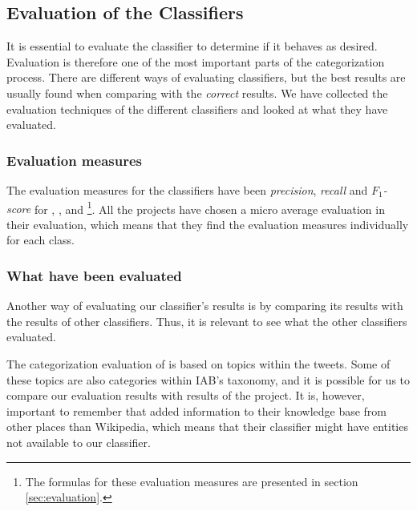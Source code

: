 \subsection{Evaluation of the Classifiers}
It is essential to evaluate the classifier to determine if it behaves as desired. Evaluation is therefore one of the most important parts of the categorization process. There are different ways of evaluating classifiers, but the best results are usually found when comparing with the \emph{correct} results. %
We have collected the evaluation techniques of the different classifiers and looked at what they have evaluated.%

\subsubsection{Evaluation measures}
The evaluation measures for the classifiers have been \emph{precision}, \emph{recall} and \emph{$F_{1}$-score} for \cite{schonhofen2009identifying}, \cite{entityextraction}, \cite{brittleness} and \cite{kozlova2005automatic}\footnote{The formulas for these evaluation measures are presented in section \ref{sec:evaluation}.}. All the projects have chosen a micro average evaluation in their evaluation, which means that they find the evaluation measures individually for each class.  


\subsubsection{What have been evaluated}
Another way of evaluating our classifier's results is by comparing its results with the results of other classifiers. Thus, it is relevant to see what the other classifiers evaluated. 

The categorization evaluation of \cite{entityextraction} is based on topics within the tweets. Some of these topics  are also  categories within IAB's taxonomy, and it is possible for us to compare our evaluation results with results of the project. It is, however, important to remember that \cite{entityextraction} added information to their knowledge base from other places than Wikipedia, which means that their classifier might have entities not available to our classifier.  

